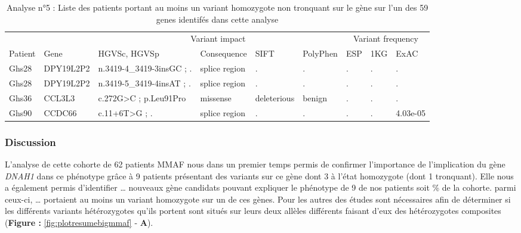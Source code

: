 \documentclass[12pt,twoside]{reedthesis}
\theoremstyle{definition}
\theoremstyle{definition}
\theoremstyle{remark}
\begin{document}
  \begin{landscape}
  \begin{longtable}[t]{lllllllll}
  \caption{\label{tab:tabgrp4moderate}Analyse n°5 : Liste des patients portant au moins un variant homozygote non tronquant sur le gène sur l'un des 59 genes identifés dans cette analyse}\\
  \toprule
  \multicolumn{1}{c}{ } & \multicolumn{1}{c}{ } & \multicolumn{4}{c}{Variant impact} & \multicolumn{3}{c}{Variant frequency} \\
  \cmidrule(l{2pt}r{2pt}){3-6} \cmidrule(l{2pt}r{2pt}){7-9}
  Patient & Gene & HGVSc, HGVSp & Consequence & SIFT & PolyPhen & ESP & 1KG & ExAC\\
  \midrule
  Ghs28 & DPY19L2P2 & n.3419-4\_3419-3insGC ; . & splice region & . & . & . & . & .\\
  Ghs28 & DPY19L2P2 & n.3419-5\_3419-4insAT ; . & splice region & . & . & . & . & .\\
  Ghs36 & CCL3L3 & c.272G>C ; p.Leu91Pro & missense & deleterious & benign & . & . & .\\
  Ghs90 & CCDC66 & c.11+6T>G ; . & splice region & . & . & . & . & 4.03e-05\\
  \bottomrule
  \end{longtable}
  \end{landscape}
  
  \newpage
  
  \newpage
  
  \subsubsection{Discussion}\label{discussion-1}
  
  L'analyse de cette cohorte de 62 patients MMAF nous dans un premier
  temps permis de confirmer l'importance de l'implication du gène
  \emph{DNAH1} dans ce phénotype grâce à 9 patients présentant des
  variants sur ce gène dont 3 à l'état homozygote (dont 1 tronquant). Elle
  nous a également permis d'identifier \ldots{} nouveaux gène candidats
  pouvant expliquer le phénotype de 9 de nos patients soit \% de la
  cohorte. parmi ceux-ci, \ldots{} portaient au moins un variant
  homozygote sur un de ces gènes. Pour les autres des études sont
  nécessaires afin de déterminer si les différents variants hétérozygotes
  qu'ils portent sont situés sur leurs deux allèles différents faisant
  d'eux des hétérozygotes composites (\textbf{Figure :
  }\ref{fig:plotresumebigmmaf} - \textbf{A}).
  
\end{document}
